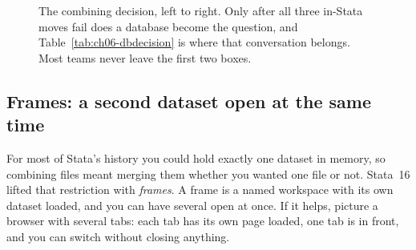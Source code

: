 \documentclass[
    a4paper,
    fontsize=10pt,
    twoside=true,
    numbers=noenddot,
]{kaobook}
\begin{document}
\begin{figure}[htbp]
\centering
{}
\caption[Append, merge, frames, or a database]{The combining decision, left to right. Only after all three in-Stata moves fail does a database become the question, and Table~\ref{tab:ch06-dbdecision} is where that conversation belongs. Most teams never leave the first two boxes.}
\label{fig:ch06-combine}
\end{figure}

\subsection{Frames: a second dataset open at the same time}\label{sec:ch06-frames}
For most of Stata's history you could hold exactly one dataset in memory, so combining files meant merging them whether you wanted one file or not. Stata~16 lifted that restriction with \emph{frames}. A frame is a named workspace with its own dataset loaded, and you can have several open at once. If it helps, picture a browser with several tabs: each tab has its own page loaded, one tab is in front, and you can switch without closing anything.
\end{document}
